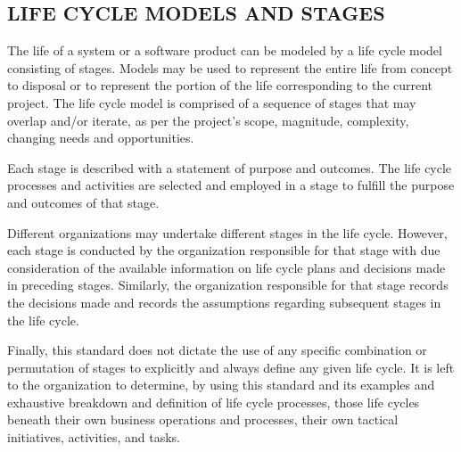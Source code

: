 	\subsection{LIFE CYCLE MODELS AND STAGES}
	\begin{adjustwidth}{0.5em}{0pt}

		The life of a system or a software product can be modeled by a life cycle model consisting of stages. Models may be used to represent the entire life from concept to disposal or to represent the portion of the life corresponding to the current project. The life cycle model is comprised of a sequence of stages that may overlap and/or iterate, as per the project's scope, magnitude, complexity, changing needs and opportunities. 

		Each stage is described with a statement of purpose and outcomes. The life cycle processes and activities are selected and employed in a stage to fulfill the purpose and outcomes of that stage. 

		Different organizations may undertake different stages in the life cycle. However, each stage is conducted by the organization responsible for that stage with due consideration of the available information on life cycle plans and decisions made in preceding stages. Similarly, the organization responsible for that stage records the decisions made and records the assumptions regarding subsequent stages in the life cycle.

		Finally, this standard does not dictate the use of any specific combination or permutation of stages to explicitly and always define any given life cycle. It is left to the organization to determine, by using this standard and its examples and exhaustive breakdown and definition of life cycle processes, those life cycles beneath their own business operations and processes, their own tactical initiatives, activities, and tasks. 

	\end{adjustwidth}